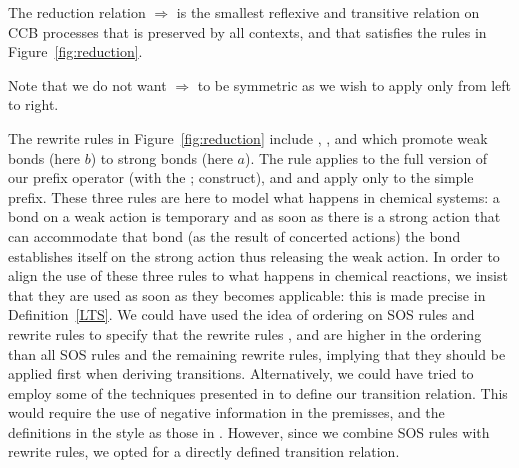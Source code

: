 \begin{definition} \normalfont The reduction relation $\Rightarrow$ is the smallest reflexive and 
transitive relation on CCB processes that is preserved by all contexts, and that satisfies the rules 
in Figure~\ref{fig:reduction}.
\end{definition}
Note that we do not want $\Rightarrow$ to be symmetric as we wish to apply  only 
from left to right. 

The rewrite rules in Figure~\ref{fig:reduction} include 
, , and  which  
promote weak bonds (here $b$) to strong bonds (here $a$).
The rule  applies to the full version of our prefix operator (with the ; construct), and
 and  apply only to the simple prefix.
These three rules are here to model what happens in chemical systems: a bond on a weak action is 
temporary and as soon as there is a strong action that can accommodate that bond (as the result
of concerted actions) the bond establishes itself on the strong action thus releasing the weak action.
In order to align the use of these three rules to what happens in chemical reactions, we insist
that they are used as soon as they becomes applicable: this is made 
precise in Definition~\ref{LTS}.
We could have used the idea of ordering on SOS rules and rewrite rules \cite{irek2002,mousavi}
to specify that the rewrite rules ,  and  are higher 
in the ordering than all SOS rules and the remaining rewrite rules, implying that they should 
be applied first when deriving transitions. Alternatively, we could have tried to 
employ some of the techniques presented in \cite{Cleaveland2001711} to define our transition relation.
This would require the use of negative information in the premisses, and the definitions in the style
as those in \cite{irek2002,mousavi}.  However, since we combine SOS rules
with rewrite rules, we opted for a directly defined transition relation.


